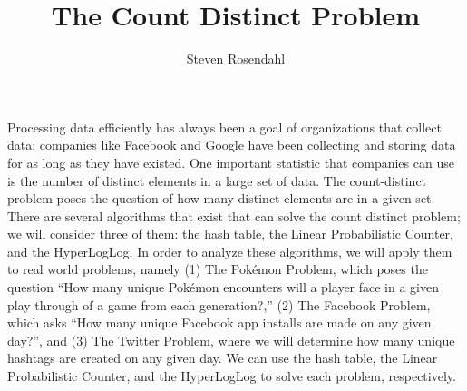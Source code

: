 \documentclass{article}
\title{The Count Distinct Problem}
\author{Steven Rosendahl}
\date{}
\begin{document}
\maketitle
\indent Processing data efficiently has always been a goal of organizations that collect data; companies like Facebook and Google have been collecting and storing data for as long as they have existed.
One important statistic that companies can use is the number of distinct elements in a large set of data.
The count-distinct problem poses the question of how many distinct elements are in a given set. 
There are several algorithms that exist that can solve the count distinct problem; we will consider three of them:
the hash table, the Linear Probabilistic Counter, and the HyperLogLog. 
In order to analyze these algorithms, we will apply them to real world problems, namely (1) The Pok\'emon Problem, which poses the question ``How many unique Pok\'emon encounters will a player face in a given play through of a game from each generation?,'' (2) The Facebook Problem, which asks ``How many unique Facebook app installs are made on any given day?'', and (3) The Twitter Problem, where we will determine how many unique hashtags are created on any given day. 
We can use the hash table, the Linear Probabilistic Counter, and the HyperLogLog to solve each problem, respectively.\\
\end{document}
